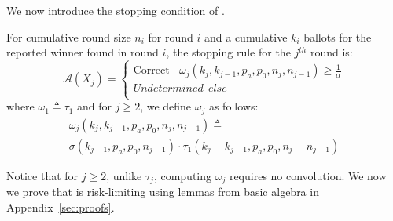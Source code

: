 We now introduce the stopping condition of \Providence.

\begin{definition}
    \label{def:minervatwo}
    For cumulative round size $n_i$ for round $i$ and a cumulative $k_i$ ballots for the reported winner found in round $i$, the \R \Providence stopping rule for the $j^{th}$ round is:
$$
\mathcal{A}(X_{j})=  \left\{ \begin{array}{ll} \text{Correct} ~~~~ \omega_{j}(k_{j}, k_{j-1}, p_a, p_0, n_j, n_{j-1}) \geq \frac{1}{\alpha}\\
        Undetermined ~~else \\
    \end{array}
    \right .
$$
where $\omega _{1}\triangleq \tau_{1}$ and for $j\ge 2$, we define $\omega _{j}$ as follows:
\begin{equation}
    \begin{aligned}
    \omega_{j}(k_{j}, k_{j-1}, p_a, p_0, n_{j}, n_{j-1})
    \triangleq\\
    \sigma(k_{j-1},p_a,p_0,n_{j-1})\cdot \tau_1(k_{j}-k_{j-1},p_a,p_0,n_j-n_{j-1})
    \end{aligned}
\end{equation}
\end{definition}

Notice that for $j\ge 2$, unlike $\tau_j$, computing $\omega_j$ requires no convolution. We now we prove that \Providence is risk-limiting using lemmas from basic algebra in Appendix~\ref{sec:proofs}.

